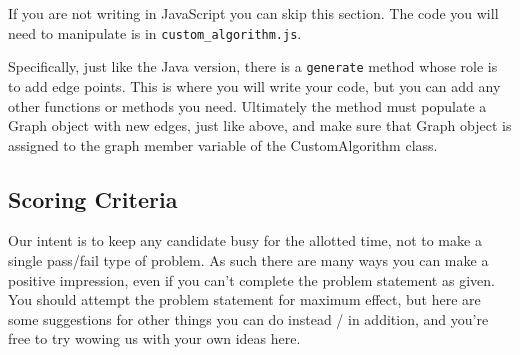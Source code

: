\documentclass[12pt]{article}
\newcommand{\nl}{\newline}
\begin{document}
If you are not writing in JavaScript you can skip this section.\nl
The code you will need to manipulate is in \texttt{custom\_algorithm.js}.

Specifically, just like the Java version, there is a \texttt{generate} method
whose role is to add edge points. This is where you will write your code, but
you can add any other functions or methods you need. Ultimately the method must
populate a Graph object with new edges, just like above, and make sure that
Graph object is assigned to the graph member variable of the CustomAlgorithm
class.

\subsection*{Scoring Criteria}

Our intent is to keep any candidate busy for the allotted time, not to make a
single pass/fail type of problem. As such there are many ways you can make a
positive impression, even if you can't complete the problem statement as given.
You should attempt the problem statement for maximum effect, but here are some
suggestions for other things you can do instead / in addition, and you're free
to try wowing us with your own ideas here.
\end{document}
